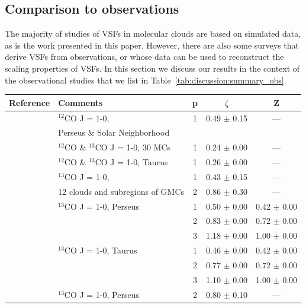 \documentclass{aa}		%
\begin{document}
\subsection{Comparison to observations}\label{discussion:observation}

The majority of studies of VSFs in molecular clouds are based on simulated data, as is the work presented in this paper.
However, there are also some surveys that derive VSFs from observations, or whose data can be used to reconstruct the scaling properties of VSFs. 
In this section we discuss our results in the context of the observational studies that we list in Table~\ref{tab:discussion:summary_obs}.

\begin{table} 
\centering 
	\begin{tabular}{llccc} 
	\centering 
		Reference 	& Comments & p & $\zeta$ & Z \\ \hline  \hline
        \citet{Heyer2004}	& $^{12}$CO J = 1-0, & 1 &  0.49 $\pm$  0.15 &  --- \\ 
                            & Perseus \& Solar Neighborhood & & & \\ \hline
        \citet{Heyer2015} 	& $^{12}$CO \& $^{13}$CO J = 1-0, 30  MCs & 1 &  0.24 $\pm$ 0.00 & --- \\ 
                            & $^{12}$CO \& $^{13}$CO J = 1-0, Taurus &  1 &  0.26 $\pm$  0.00 & --- \\  \hline
        \citet{Miesch1994} 	& $^{13}$CO J = 1-0, & 1 &  0.43 $\pm$  0.15 & --- \\ 
                            & 12 clouds and subregions of GMCs & 2 &  0.86 $\pm$  0.30 &  --- \\  \hline
        \citet{Padoan2003}	& $^{13}$CO J = 1-0, Perseus & 1 &  0.50 $\pm$  0.00 &  0.42 $\pm$  0.00 \\ 
                            &  & 2 &  0.83 $\pm$  0.00 &  0.72 $\pm$  0.00 \\ 
                            &		 & 3 &  1.18 $\pm$  0.00 &  1.00 $\pm$  0.00 \\ 
                            & $^{13}$CO J = 1-0, Taurus & 1 &  0.46 $\pm$  0.00 &  0.42 $\pm$  0.00 \\ 
                            &		 & 2 &  0.77 $\pm$  0.00 &  0.72 $\pm$  0.00 \\ 
                            &		 & 3 &  1.10 $\pm$  0.00 &  1.00 $\pm$  0.00 \\  \hline
        \citet{Padoan2006} 	& $^{13}$CO J = 1-0, Perseus & 2 &   0.80 $\pm$  0.10    &  --- \\  \hline

\end{tabular}
\end{table}
\end{document}
